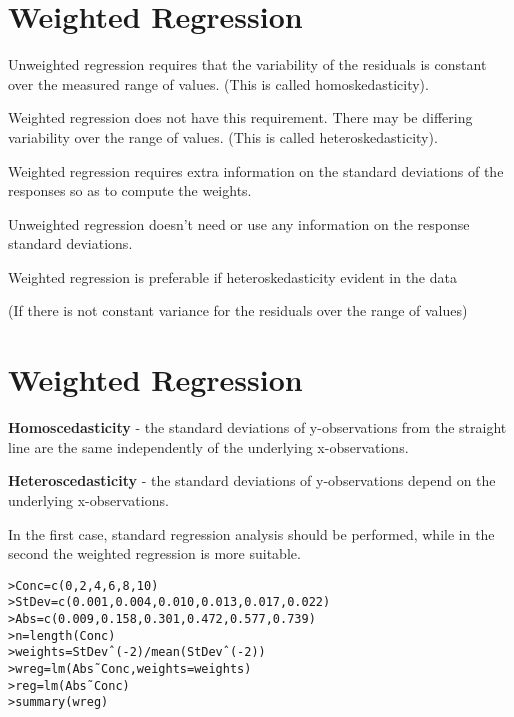 \documentclass[a4paper,12pt]{article}
\begin{document}
\section{Weighted Regression}
Unweighted regression requires that the variability of the
residuals is constant over the measured range of values.
(This is called homoskedasticity).

Weighted regression does not have this requirement.
There may be differing variability over the range of values.
(This is called heteroskedasticity).

Weighted regression requires extra information on the standard deviations of the responses so as to compute the weights.

Unweighted regression doesn’t need or use any information on the response standard deviations.

Weighted regression is preferable if heteroskedasticity evident in the data

(If there is not constant variance for the residuals over the range of values)


\section{Weighted Regression}

\textbf{Homoscedasticity} - the standard deviations of
y-observations from the straight line are the same independently
of the underlying x-observations.

\textbf{Heteroscedasticity} - the standard deviations of
y-observations depend on the underlying x-observations.

In the first case, standard regression analysis should be
performed, while in the second the weighted regression is more
suitable.

\begin{verbatim}
>Conc=c(0,2,4,6,8,10)
>StDev=c(0.001,0.004,0.010,0.013,0.017,0.022)
>Abs=c(0.009,0.158,0.301,0.472,0.577,0.739)
>n=length(Conc)
>weights=StDevˆ(-2)/mean(StDevˆ(-2))
>wreg=lm(Abs˜Conc,weights=weights)
>reg=lm(Abs˜Conc)
>summary(wreg)
\end{verbatim}
\end{document}
